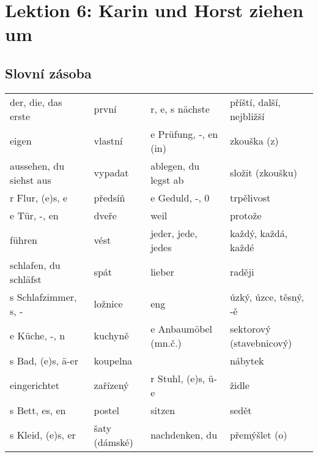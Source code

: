 \chapter{Lektion 6: Karin und Horst ziehen um}\label{NJ:chap_N1_L6}
\minitoc
  
  \section{Slovní zásoba}
    \begin{table}[ht!]   %
      \centering
      \begin{tabular}{llll}
        \hline
          der, die, das erste     & první    & r, e, s nächste        & příští, další, nejbližší  \\
          eigen                   & vlastní  & e Prüfung, -, en (in)  &  zkouška (z)              \\
          aussehen, du siehst aus & vypadat  &  ablegen, du legst ab  & složit (zkoušku)          \\
          r Flur, (e)s, e         & předsíň  & e Geduld, -, 0         & trpělivost                \\
          e Tür, -, en            & dveře    & weil                   & protože                   \\
          führen                  & vést     & jeder, jede, jedes     & každý, každá, každé       \\
          schlafen, du schläfst   & spát     &  lieber                & raději                    \\
          s Schlafzimmer, s, -    & ložnice  & eng                    & úzký, úzce, těsný, -ě     \\
          e Küche, -, n           & kuchyně  & e Anbaumöbel (mn.č.)   & sektorový (stavebnicový)  \\
          s Bad, (e)s, ä-er       & koupelna &                        &  nábytek                  \\
          eingerichtet            & zařízený &  r Stuhl, (e)s, ü-e    & židle                     \\
          s Bett, es, en          & postel   & sitzen                 &  sedět                    \\
          s Kleid, (e)s, er       & šaty (dámské) & nachdenken, du    & přemýšlet (o)             \\

\end{tabular}
\end{table}
